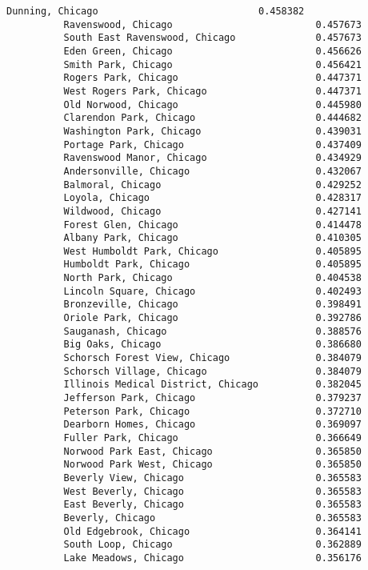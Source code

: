 \documentclass[11pt]{article}
\begin{document}
\begin{Verbatim}[commandchars=\\\{\}]
          Dunning, Chicago                            0.458382
          Ravenswood, Chicago                         0.457673
          South East Ravenswood, Chicago              0.457673
          Eden Green, Chicago                         0.456626
          Smith Park, Chicago                         0.456421
          Rogers Park, Chicago                        0.447371
          West Rogers Park, Chicago                   0.447371
          Old Norwood, Chicago                        0.445980
          Clarendon Park, Chicago                     0.444682
          Washington Park, Chicago                    0.439031
          Portage Park, Chicago                       0.437409
          Ravenswood Manor, Chicago                   0.434929
          Andersonville, Chicago                      0.432067
          Balmoral, Chicago                           0.429252
          Loyola, Chicago                             0.428317
          Wildwood, Chicago                           0.427141
          Forest Glen, Chicago                        0.414478
          Albany Park, Chicago                        0.410305
          West Humboldt Park, Chicago                 0.405895
          Humboldt Park, Chicago                      0.405895
          North Park, Chicago                         0.404538
          Lincoln Square, Chicago                     0.402493
          Bronzeville, Chicago                        0.398491
          Oriole Park, Chicago                        0.392786
          Sauganash, Chicago                          0.388576
          Big Oaks, Chicago                           0.386680
          Schorsch Forest View, Chicago               0.384079
          Schorsch Village, Chicago                   0.384079
          Illinois Medical District, Chicago          0.382045
          Jefferson Park, Chicago                     0.379237
          Peterson Park, Chicago                      0.372710
          Dearborn Homes, Chicago                     0.369097
          Fuller Park, Chicago                        0.366649
          Norwood Park East, Chicago                  0.365850
          Norwood Park West, Chicago                  0.365850
          Beverly View, Chicago                       0.365583
          West Beverly, Chicago                       0.365583
          East Beverly, Chicago                       0.365583
          Beverly, Chicago                            0.365583
          Old Edgebrook, Chicago                      0.364141
          South Loop, Chicago                         0.362889
          Lake Meadows, Chicago                       0.356176

\end{Verbatim}
\end{document}
